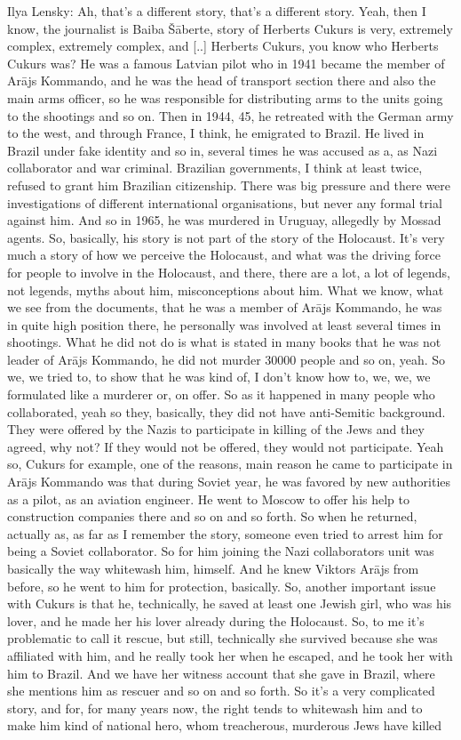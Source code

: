 Ilya Lensky: Ah, that’s a different story, that’s a different story. Yeah, then I know, the journalist is Baiba Šāberte, story of Herberts Cukurs is very, extremely complex, extremely complex, and [..] Herberts Cukurs, you know who Herberts Cukurs was? He was a famous Latvian pilot who in 1941 became the member of Arājs Kommando, and he was the head of transport section there and also the main arms officer, so he was responsible for distributing arms to the units going to the shootings and so on. Then in 1944, 45, he retreated with the German army to the west, and through France, I think, he emigrated to Brazil. He lived in Brazil under fake identity and so in, several times he was accused as a, as Nazi collaborator and war criminal. Brazilian governments, I think at least twice, refused to grant him Brazilian citizenship. There was big pressure and there were investigations of different international organisations, but never any formal trial against him. And so in 1965, he was murdered in Uruguay, allegedly by Mossad agents. So, basically, his story is not part of the story of the Holocaust. It’s very much a story of how we perceive the Holocaust, and what was the driving force for people to involve in the Holocaust, and there, there are a lot, a lot of legends, not legends, myths about him, misconceptions about him. What we know, what we see from the documents, that he was a member of Arājs Kommando, he was in quite high position there, he personally was involved at least several times in shootings. What he did not do is what is stated in many books that he was not leader of Arājs Kommando, he did not murder 30000 people and so on, yeah. So we, we tried to, to show that he was kind of, I don’t know how to, we, we, we formulated like a murderer or, on offer. So as it happened in many people who collaborated, yeah so they, basically, they did not have anti-Semitic background. They were offered by the Nazis to participate in killing of the Jews and they agreed, why not? If they would not be offered, they would not participate. Yeah so, Cukurs for example, one of the reasons, main reason he came to participate in Arājs Kommando was that during Soviet year, he was favored by new authorities as a pilot, as an aviation engineer. He went to Moscow to offer his help to construction companies there and so on and so forth. So when he returned, actually as, as far as I remember the story, someone even tried to arrest him for being a Soviet collaborator. So for him joining the Nazi collaborators unit was basically the way whitewash him, himself. And he knew Viktors Arājs from before, so he went to him for protection, basically. So, another important issue with Cukurs is that he, technically, he saved at least one Jewish girl, who was his lover, and he made her his lover already during the Holocaust. So, to me it’s problematic to call it rescue, but still, technically she survived because she was affiliated with him, and he really took her when he escaped, and he took her with him to Brazil. And we have her witness account that she gave in Brazil, where she mentions him as rescuer and so on and so forth. So it’s a very complicated story, and for, for many years now, the right tends to whitewash him and to make him kind of national hero, whom treacherous, murderous Jews have killed 